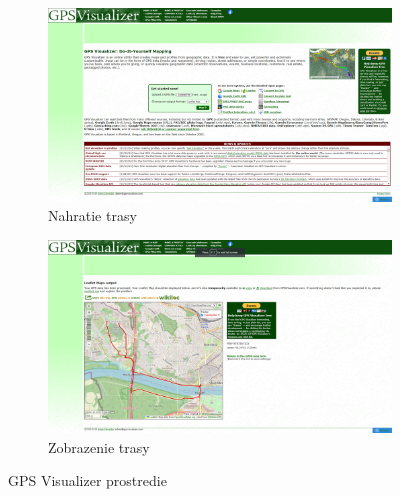 \begin{figure}[H]
  \centering
  \begin{subfigure}{.7\textwidth}
    \centering
    \includegraphics[width=1\textwidth]{img/gps_visualizer/gpsvisualizer1.png}
    \caption{Nahratie trasy}
  \end{subfigure}
  \begin{subfigure}{.7\textwidth}
    \centering
    \includegraphics[width=1\textwidth]{img/gps_visualizer/gpsvisualizer2.png}
    \caption{Zobrazenie trasy}
  \end{subfigure}
  \caption{GPS Visualizer prostredie}
  \label{fig:gps-visualizer}
\end{figure}


